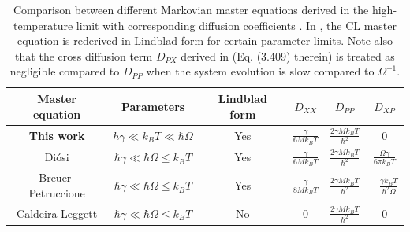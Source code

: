 \documentclass[prl,twocolumn,superscriptaddress,amsmath,amssymb]{revtex4-2}
\newcommand{\hb}{\hbar}
\begin{document}
\begin{table}
\begin{ruledtabular}
\begin{tabular}{cccccc}
 Master equation&Parameters&Lindblad form&$D_{XX}$
&$D_{PP}$&$D_{XP}$\\ \hline
 {\bf This work}&$\hb\gamma\ll k_BT\ll\hb\Omega$&Yes&$\frac{\gamma}{6Mk_BT}$&$\frac{2\gamma Mk_BT}{\hb^2}$ \rule{0pt}{2.4ex}&0 \\
 Di\'{o}si \cite{Diosi1993,Diosi1993a}&$\hb\gamma\ll\hb\Omega\leq k_BT$&Yes&$\frac{\gamma}{6Mk_BT}$&$\frac{2\gamma Mk_BT}{\hb^2}$&$\frac{\Omega\gamma}{6\pi k_BT}$\\
 Breuer-Petruccione \cite{BP2002}&$\hb\gamma\ll\hb\Omega\leq k_BT$&Yes&$\frac{\gamma}{8Mk_BT}$&$\frac{2\gamma Mk_BT}{\hb^2}$&$-\frac{\gamma k_BT}{\hb^2\Omega}$\\
Caldeira-Leggett \cite{CaldeiraLeggettA}&$\hb\gamma\ll\hb\Omega\leq k_BT$&No&0&$\frac{2\gamma M k_BT}{\hb^2}$&0
\end{tabular}
\end{ruledtabular}
\caption{\label{tab1} Comparison between different Markovian master equations derived in the high-temperature limit with corresponding diffusion coefficients \cite{Homa2019}. In \cite{Diosi1993,Diosi1993a}, the CL master equation is rederived in Lindblad form for certain parameter limits. Note also that the cross diffusion term $D_{PX}$ derived in \cite{BP2002} (Eq. (3.409) therein) is treated as negligible compared to $D_{PP}$ when the system evolution is slow compared to $\Omega^{-1}$.}
\end{table}
\end{document}
